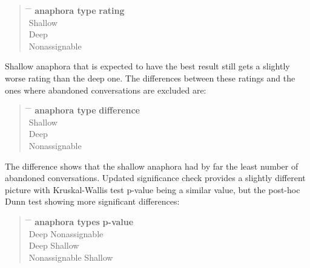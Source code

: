\begin{quote}
\begin{tabbing}
\hspace{4cm} \= \hspace{4cm} \= \kill %
\textbf{anaphora type} \> \textbf{rating} \\
Shallow  \\
Deep  \\
Nonassignable  \\
\end{tabbing}
\end{quote}

Shallow anaphora that is expected to have the best result still gets a slightly worse rating than the deep one.
The differences between these ratings and the ones where abandoned conversations are excluded are:

\begin{quote}
\begin{tabbing}
\hspace{4cm} \= \hspace{4cm} \= \kill %
\textbf{anaphora type} \> \textbf{difference} \\
Shallow  \\
Deep  \\
Nonassignable  \\
\end{tabbing}
\end{quote}

The difference shows that the shallow anaphora had by far the least number of abandoned conversations.
Updated significance check provides a slightly different picture with
Kruskal-Wallis test p-value being a similar value, but
the post-hoc Dunn test showing more significant differences:

\begin{quote}
\begin{tabbing}
\hspace{4cm} \= \hspace{4cm} \= \kill %
\textbf{anaphora types} \> \> \textbf{p-value} \\
Deep \> Nonassignable  \\
Deep \> Shallow  \\
Nonassignable \> Shallow  \\
\end{tabbing}
\end{quote}

